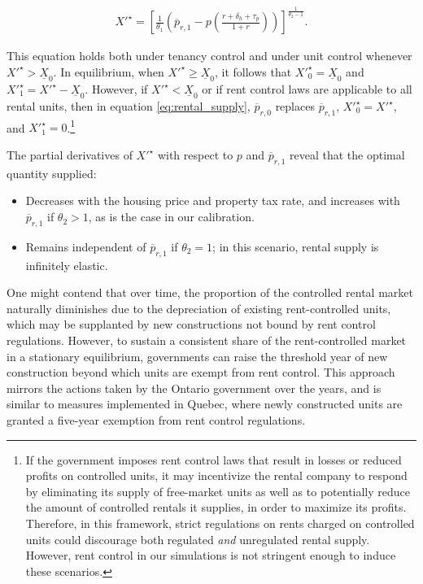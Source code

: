 \documentclass[parskip=full]{article}
\begin{document}
\begin{align}\label{eq:rental_supply}
X'^{\star}=\left[\frac{1}{\theta_{1}}\left(\overline{p}_{r,1}-p\left(\frac{r+\delta_{h}+\tau_{p}}{1+r}\right)\right)\right]^{\frac{1}{\theta_{2}-1}}.
\end{align}

\noindent This equation holds both under tenancy control and under unit control whenever $X'^{\star}>\underline{X}_{0}$. In equilibrium, when $X'^{\star} \geq \underline{X}_{0}$, it follows that $X'^{\star}_{0}=\underline{X}_{0}$ and $X'^{\star}_{1}=X'^{\star}-\underline{X}_{0}$. However, if $X'^{\star} < \underline{X}_{0}$ or if rent control laws are applicable to all rental units, then in equation \eqref{eq:rental_supply}, $\overline{p}_{r,0}$ replaces $\overline{p}_{r,1}$, $X'^{\star}_{0}=X'^{\star}$, and $X'^{\star}_{1}=0$.\footnote{If the government imposes rent control laws that result in losses or reduced profits on controlled units, it may incentivize the rental company to respond by eliminating its supply of free-market units as well as to potentially reduce the amount of controlled rentals it supplies, in order to maximize its profits. Therefore, in this framework, strict regulations on rents charged on controlled units could discourage both regulated \textsl{and} unregulated rental supply. However, rent control in our simulations is not stringent enough to induce these scenarios.}

\noindent The partial derivatives of $X'^{\star}$ with respect to $p$ and $\overline{p}_{r,1}$ reveal that the optimal quantity supplied:

\begin{itemize}
    \item Decreases with the housing price and property tax rate, and increases with $\overline{p}_{r,1}$ if $\theta_{2} > 1$, as is the case in our calibration.
    \item Remains independent of $\overline{p}_{r,1}$ if $\theta_{2} = 1$; in this scenario, rental supply is infinitely elastic.
\end{itemize}

One might contend that over time, the proportion of the controlled rental market naturally diminishes due to the depreciation of existing rent-controlled units, which may be supplanted by new constructions not bound by rent control regulations. However, to sustain a consistent share of the rent-controlled market in a stationary equilibrium, governments can raise the threshold year of new construction beyond which units are exempt from rent control. This approach mirrors the actions taken by the Ontario government over the years, and is similar to measures implemented in Quebec, where newly constructed units are granted a five-year exemption from rent control regulations.
\end{document}
